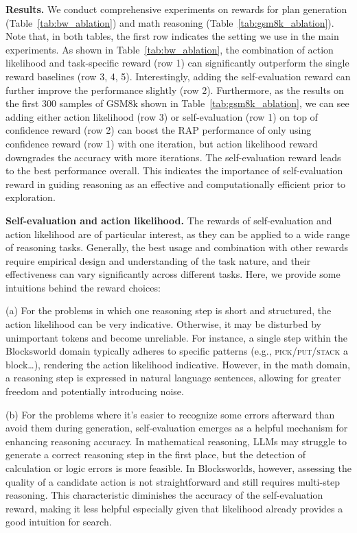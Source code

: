 \noindent \textbf{Results.} We conduct comprehensive experiments on rewards for plan generation (Table~\ref{tab:bw_ablation}) and math reasoning (Table~\ref{tab:gsm8k_ablation}). Note that, in both tables, the first row indicates the setting we use in the main experiments. As shown in Table~\ref{tab:bw_ablation}, the combination of action likelihood and task-specific reward (row 1) can significantly outperform the single reward baselines (row 3, 4, 5). Interestingly, adding the self-evaluation reward can further improve the performance slightly (row 2). Furthermore, as the results on the first 300 samples of GSM8k shown in Table~\ref{tab:gsm8k_ablation}, we can see adding either action likelihood (row 3) or self-evaluation (row 1) on top of confidence reward (row 2) can boost the RAP performance of only using confidence reward (row 1) with one iteration, but action likelihood reward downgrades the accuracy with more iterations. The self-evaluation reward leads to the best performance overall. This indicates the importance of self-evaluation reward in guiding reasoning as an effective and computationally efficient prior to exploration.

\noindent\textbf{Self-evaluation and action likelihood.}
The rewards of self-evaluation and action likelihood are of particular interest, as they can be applied to a wide range of reasoning tasks. Generally, the best usage and combination with other rewards require empirical design and understanding of the task nature, and their effectiveness can vary significantly across different tasks. Here, we provide some intuitions behind the reward choices:

(a) For the problems in which one reasoning step is short and structured, the action likelihood can be very indicative. Otherwise, it may be disturbed by unimportant tokens and become unreliable. For instance, a single step within the Blocksworld domain typically adheres to specific patterns (e.g., \textsc{pick/put/stack} a block…), rendering the action likelihood indicative. However, in the math domain, a reasoning step is expressed in natural language sentences, allowing for greater freedom and potentially introducing noise.

(b) For the problems where it’s easier to recognize some errors afterward than avoid them during generation, self-evaluation emerges as a helpful mechanism for enhancing reasoning accuracy. In mathematical reasoning, LLMs may struggle to generate a correct reasoning step in the first place, but the detection of calculation or logic errors is more feasible. In Blocksworlds, however, assessing the quality of a candidate action is not straightforward and still requires multi-step reasoning. This characteristic diminishes the accuracy of the self-evaluation reward, making it less helpful especially given that likelihood already provides a good intuition for search.

